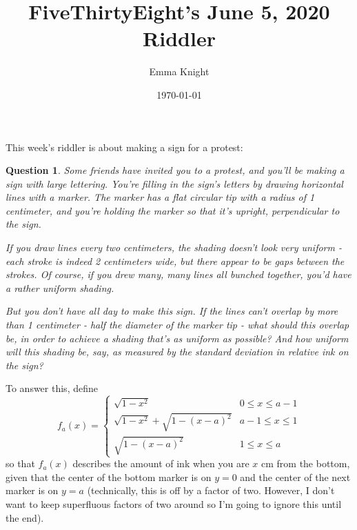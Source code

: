 \documentclass[11pt]{article}
\title{FiveThirtyEight's June 5, 2020 Riddler}
\author{Emma Knight}
\date{\today}
\newtheorem{question}[theorem]{Question}
\theoremstyle{definition}
\begin{document}
\maketitle

This week's riddler is about making a sign for a protest:
\begin{question}
Some friends have invited you to a protest, and you'll be making a sign with large lettering. You're filling in the sign's letters by drawing horizontal lines with a marker. The marker has a flat circular tip with a radius of 1 centimeter, and you're holding the marker so that it's upright, perpendicular to the sign.

If you draw lines every two centimeters, the shading doesn't look very uniform - each stroke is indeed 2 centimeters wide, but there appear to be gaps between the strokes. Of course, if you drew many, many lines all bunched together, you'd have a rather uniform shading.

But you don't have all day to make this sign. If the lines can't overlap by more than 1 centimeter - half the diameter of the marker tip - what should this overlap be, in order to achieve a shading that's as uniform as possible? And how uniform will this shading be, say, as measured by the standard deviation in relative ink on the sign?
\end{question}
To answer this, define $$f_a(x) = \begin{cases} \sqrt{1-x^2} & 0 \leq x \leq a-1 \\ \sqrt{1-x^2} + \sqrt{1-(x-a)^2} & a-1 \leq x \leq 1 \\\sqrt{1-(x-a)^2} & 1 \leq x \leq a \end{cases}$$
so that $f_a(x)$ describes the amount of ink when you are $x$ cm from the bottom, given that the center of the bottom marker is on $y = 0$ and the center of the next marker is on $y = a$ (technically, this is off by a factor of two.  However, I don't want to keep superfluous factors of two around so I'm going to ignore this until the end).
\end{document}
